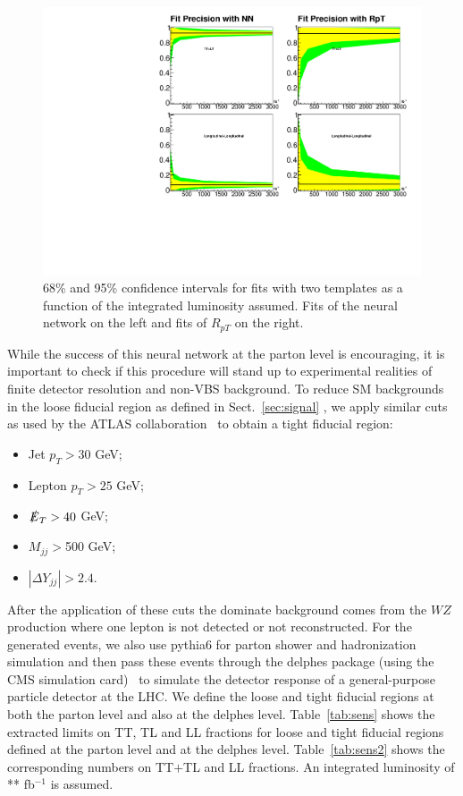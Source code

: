 \begin{figure}
\includegraphics[width=.45\textwidth]{./fig/sens_2.pdf}
\caption{\label{fig:sen_2} 68\% and 95\% confidence intervals for fits with two templates as a function of the integrated luminosity assumed. Fits of the neural network on the left and fits of $R_{pT}$ on the right.}
\end{figure}

While the success of this neural network at the parton level is encouraging, it is important to check if this procedure will stand
up to experimental realities of finite detector resolution and non-VBS background. To reduce SM backgrounds in the loose fiducial region as defined in 
Sect.~\ref{sec:signal} , we apply similar cuts as used by the ATLAS collaboration~\cite{ATLAS_ssWW} to obtain a tight fiducial region:

\begin{itemize}
\item Jet $p_T > 30$ GeV;
\item Lepton $p_T > 25$ GeV;
\item $\slashed{E}_T > 40$ GeV;
\item $M_{jj} > $500 GeV;
\item $|\Delta Y_{jj}| > 2.4 $.
\end{itemize}

After the application of these cuts the dominate background comes from the $WZ$ production where one lepton is not detected or not reconstructed.  
For the generated \ssWW events, we also use {\sc pythia6} for parton shower and hadronization simulation and then pass these events through the 
{\sc delphes} package (using the CMS simulation card)~\cite{delphes} to simulate the detector response of a general-purpose particle detector at the LHC. 
We define the loose and tight fiducial regions at both the parton level and also at the {\sc delphes} level. 
Table~\ref{tab:sens} shows the extracted limits on TT, TL and LL fractions for loose and tight fiducial regions defined 
at the parton level and at the {\sc delphes} level. 
Table~\ref{tab:sens2} shows the corresponding numbers on TT$+$TL and LL fractions. 
An integrated luminosity of ** fb$^{-1}$ is assumed. 

